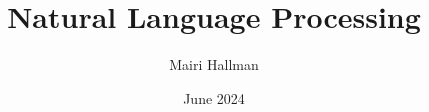 \documentclass{article}
\title{Natural Language Processing}
\author{Mairi Hallman}
\date{June 2024}
\begin{document}
\maketitle

\newpage

\tableofcontents
\newpage
\cite{Wachsmuth2015}
\printbibliography
\end{document}
